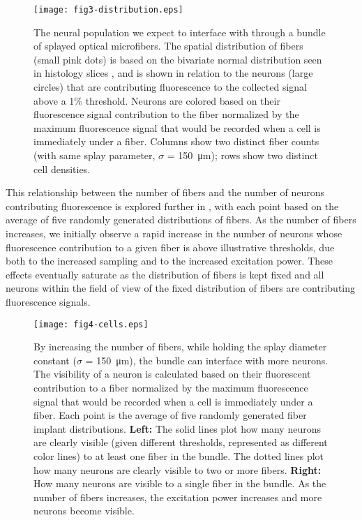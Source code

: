 \begin{figure}
\texttt{[image: fig3-distribution.eps]}
\caption[Modeled distribution of fibers and neurons]{The neural population we expect to interface with through a bundle of splayed optical microfibers. The spatial distribution of fibers (small pink dots) is based on the bivariate normal distribution seen in histology slices \cite{Perkins:2018ae}, and is shown in relation to the neurons (large circles) that are contributing fluorescence to the collected signal above a 1\% threshold. Neurons are colored based on their fluorescence signal contribution to the fiber normalized by the maximum fluorescence signal that would be recorded when a cell is immediately under a fiber. Columns show two distinct fiber counts (with same splay parameter, $\sigma$ = 150~\si{\micro\meter}); rows show two distinct cell densities.}
\label{fig:distribution}
\end{figure}

This relationship between the number of fibers and the number of neurons contributing fluorescence is explored further in , with each point based on the average of five randomly generated distributions of fibers. As the number of fibers increases, we initially observe a rapid increase in the number of neurons whose fluorescence contribution to a given fiber is above illustrative thresholds, due both to the increased sampling and to the increased excitation power. These effects eventually saturate as the distribution of fibers is kept fixed and all neurons within the field of view of the fixed distribution of fibers are contributing fluorescence signals.

\begin{figure}
\texttt{[image: fig4-cells.eps]}
\caption[Effect of fiber count on number of neurons contributing signal]{By increasing the number of fibers, while holding the splay diameter constant ($\sigma$ = 150~\si{\micro\meter}), the bundle can interface with more neurons. The visibility of a neuron is calculated based on their fluorescent contribution to a fiber normalized by the maximum fluorescence signal that would be recorded when a cell is immediately under a fiber. Each point is the average of five randomly generated fiber implant distributions. \textbf{Left:} The solid lines plot how many neurons are clearly visible (given different thresholds, represented as different color lines) to at least one fiber in the bundle. The dotted lines plot how many neurons are clearly visible to two or more fibers. \textbf{Right:} How many neurons are visible to a single fiber in the bundle. As the number of fibers increases, the excitation power increases and more neurons become visible.}
\label{fig:cells}
\end{figure}

